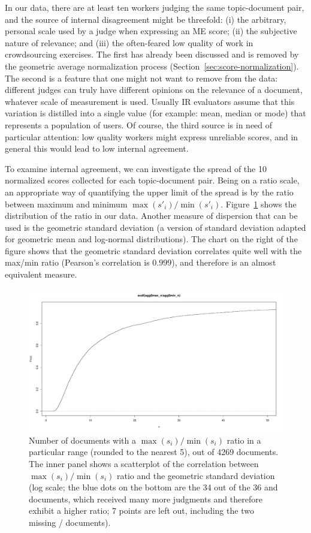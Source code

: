 In our data, there are
at least ten workers judging the same topic-document pair, and
the source of internal disagreement might be threefold:
(i) the arbitrary, personal scale used by a judge when expressing an ME
score; 
(ii) the subjective nature of relevance; and 
(iii) the often-feared low quality of work in crowdsourcing exercises.
The first has already been discussed and is removed by the geometric
average normalization process (Section~\ref{sec:score-normalization}).
The second is a feature that one might not want to remove from the
data: different judges can truly have different opinions on the
relevance of a document, whatever scale of measurement is used.
Usually IR evaluators assume that this variation is distilled into a single 
value (for example: mean, median or mode) 
that represents a population of users.
Of course, the third source is in need of particular attention: low
quality workers might express unreliable scores, and in general this
would lead to low internal agreement.

To examine internal agreement, we can investigate the spread of 
the 10 normalized scores collected for each topic-document pair.
Being on a ratio scale, an appropriate way of quantifying the upper
limit of the spread is
by the ratio between maximum and minimum $\max(s'_i) / \min(s'_i)$.  
Figure~\ref{fig:judgeVariability} 
shows the distribution of the ratio in our data.
Another measure of dispersion that can be used is the geometric
standard deviation (a version of standard deviation adapted for
geometric mean and log-normal distributions). 
The chart on the right of the figure shows that the geometric standard
deviation correlates quite well with the max/min ratio (Pearson's
correlation is $0.999$), and therefore is an almost equivalent
measure. 

\begin{figure}[tp]
  \centering
  \includegraphics[width=.9\linewidth,page=6]{figs/JudgeVariability.pdf}
  \caption{Number of documents with a $\max(s_i) / \min(s_i)$ ratio in
    a particular range (rounded to the nearest 5), out of 4269 documents.  
    The inner panel shows a scatterplot of the correlation
    between
    $\max(s_i) / \min(s_i)$ ratio and the geometric standard deviation
    (log scale;  the blue dots on the bottom are
    the 34 out of the 36 \nkn and \hkh documents, which received many
    more judgments and therefore exhibit a higher ratio; 7 points are
    left out, including the two missing  \nkn / \hkh documents). 
    \label{fig:judgeVariability}
  }
\end{figure}

